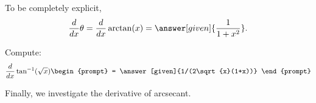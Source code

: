\documentclass{ximera}
\begin{document}
\begin{theorem}
\begin{explanation}
To be completely explicit, 
\[
\frac{d}{dx} \theta = \frac{d}{dx} \arctan(x) = \answer[given]{\frac{1}{1+x^2}}.
\]
\end{explanation}
\end{theorem}

\begin{question}
  Compute:
  \[
  \frac{d}{dx} \tan^{-1}(\sqrt{x})
  \begin{prompt}
    = \answer[given]{1/(2\sqrt{x}(1+x))}
  \end{prompt}
  \]
\end{question}



Finally, we investigate the derivative of arcsecant.
\end{document}
